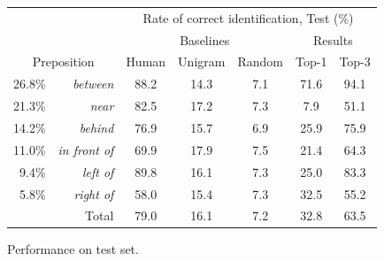 \documentclass[conference]{IEEEtran}
\numberwithin{equation}{section}
\begin{document}
\begin{figure}[!tb]
  \centering
  \begin{tabular}{| r r | c | c | c || c c |} \hline
     & & \multicolumn{5}{c|}{Rate of correct identification, Test (\%)} \\
     & & \multicolumn{3}{c||}{Baselines} & \multicolumn{2}{c|}{Results} \\
     \multicolumn{2}{|c|}{Preposition}
			                      &   Human & Unigram & Random &  Top-1 & Top-3 \\\hline
26.8\% & \textit{between}       & 88.2  & 14.3  & 7.1   & 71.6  & 94.1 \\
21.3\% & \textit{near}          & 82.5  & 17.2  & 7.3   & 7.9   & 51.1 \\
14.2\% & \textit{behind}        & 76.9  & 15.7  & 6.9   & 25.9  & 75.9 \\
11.0\% & \textit{in front of}   & 69.9  & 17.9  & 7.5   & 21.4  & 64.3 \\
9.4\% & \textit{left of}        & 89.8  & 16.1  & 7.3   & 25.0  & 83.3 \\
5.8\% & \textit{right of}       & 58.0  & 15.4  & 7.3   & 32.5  & 55.2 \\\hline\hline
    \multicolumn{2}{|r|}{Total} & 79.0  & 16.1  & 7.2   & 32.8  & 63.5 \\\hline
  \end{tabular}
  \caption{Performance on test set.}
  \label{fig:results}
\end{figure}

\end{document}
